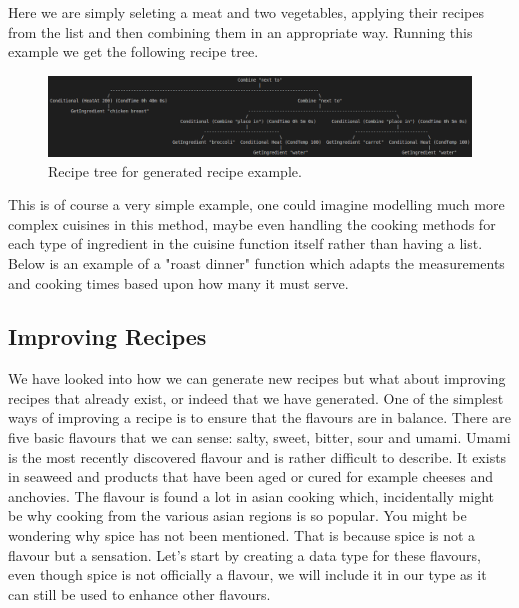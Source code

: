 \documentclass[11pt]{article}
\begin{document}
Here we are simply seleting a meat and two vegetables, applying their
recipes from the list and then combining them in an appropriate way.
Running this example we get the following recipe tree.

\begin{figure}[h]
\includegraphics[width=\textwidth, keepaspectratio]{meatTwoVeg.png}
\centering
\caption{Recipe tree for generated recipe example.}
\end{figure}

This is of course a very simple example, one could imagine modelling much more complex
cuisines in this method, maybe even handling the cooking methods for each type of
ingredient in the cuisine function itself rather than having a list. Below
is an example of a "roast dinner" function which adapts the measurements and cooking
times based upon how many it must serve.


\subsection{Improving Recipes}

We have looked into how we can generate new recipes but what about improving recipes
that already exist, or indeed that we have generated. One of the simplest ways
of improving a recipe is to ensure that the flavours are in balance. There
are five basic flavours that we can sense: salty, sweet, bitter, sour and umami.
Umami is the most recently discovered flavour and is rather difficult to describe.
It exists in seaweed and products that have been aged or cured for example cheeses
and anchovies. The flavour is found a lot in asian cooking which, incidentally might
be why cooking from the various asian regions is so popular. You might be wondering
why spice has not been mentioned. That is because spice is not a flavour but a sensation.
Let's start by creating a data type for these flavours, even though spice is not officially
a flavour, we will include it in our type as it can still be used to enhance other flavours.
\end{document}
